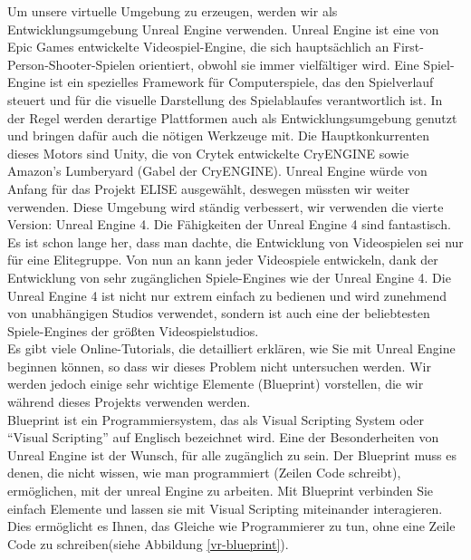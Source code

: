 Um unsere virtuelle Umgebung zu erzeugen, werden wir als Entwicklungsumgebung Unreal Engine verwenden. 
Unreal Engine ist eine von Epic Games entwickelte Videospiel-Engine, die sich haupts{\"a}chlich an First-Person-Shooter-Spielen orientiert, obwohl sie immer vielf{\"a}ltiger wird. 
Eine Spiel-Engine ist ein spezielles Framework f{\"u}r Computerspiele, das den Spielverlauf steuert und f{\"u}r die visuelle Darstellung des Spielablaufes verantwortlich ist. 
In der Regel werden derartige Plattformen auch als Entwicklungsumgebung genutzt und bringen daf{\"u}r auch die n{\"o}tigen Werkzeuge mit. 
Die Hauptkonkurrenten dieses Motors sind Unity, die von Crytek entwickelte CryENGINE sowie Amazon's Lumberyard (Gabel der CryENGINE). 
Unreal Engine w{\"u}rde von Anfang f{\"u}r das Projekt ELISE ausgew{\"a}hlt, deswegen m{\"u}ssten wir weiter verwenden. 
Diese Umgebung wird st{\"a}ndig verbessert, wir verwenden die vierte Version: Unreal Engine 4. 
Die F{\"a}higkeiten der Unreal Engine 4 sind fantastisch. 
Es ist schon lange her, dass man dachte, die Entwicklung von Videospielen sei nur f{\"u}r eine Elitegruppe. 
Von nun an kann jeder Videospiele entwickeln, dank der Entwicklung von sehr zug{\"a}nglichen Spiele-Engines wie der Unreal Engine 4. 
Die Unreal Engine 4 ist nicht nur extrem einfach zu bedienen und wird zunehmend von unabh{\"a}ngigen Studios verwendet, sondern ist auch eine der beliebtesten Spiele-Engines der gr{\"o}{\ss}ten Videospielstudios. \\

Es gibt viele Online-Tutorials, die detailliert erkl{\"a}ren, wie Sie mit Unreal Engine beginnen k{\"o}nnen, so dass wir dieses Problem nicht untersuchen werden. 
Wir werden jedoch einige sehr wichtige Elemente (Blueprint) vorstellen, die wir w{\"a}hrend dieses Projekts verwenden werden. \\

Blueprint ist ein Programmiersystem, das als Visual Scripting System oder ``Visual Scripting'' auf Englisch bezeichnet wird. 
Eine der Besonderheiten von Unreal Engine ist der Wunsch, f{\"u}r alle zug{\"a}nglich zu sein. 
Der Blueprint muss es denen, die nicht wissen, wie man programmiert (Zeilen Code schreibt), erm{\"o}glichen, mit der unreal Engine zu arbeiten. 
Mit Blueprint verbinden Sie einfach Elemente und lassen sie mit Visual Scripting miteinander interagieren. 
Dies erm{\"o}glicht es Ihnen, das Gleiche wie Programmierer zu tun, ohne eine Zeile Code zu schreiben(siehe Abbildung \ref{vr-blueprint}).\\


